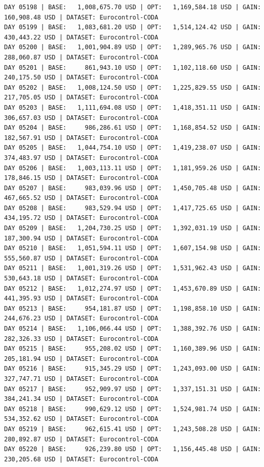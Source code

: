\documentclass[11pt,a4paper]{article}
\begin{document}
\begin{verbatim}
DAY 05198 | BASE:   1,008,675.70 USD | OPT:   1,169,584.18 USD | GAIN: 160,908.48 USD | DATASET: Eurocontrol-CODA
DAY 05199 | BASE:   1,083,681.20 USD | OPT:   1,514,124.42 USD | GAIN: 430,443.22 USD | DATASET: Eurocontrol-CODA
DAY 05200 | BASE:   1,001,904.89 USD | OPT:   1,289,965.76 USD | GAIN: 288,060.87 USD | DATASET: Eurocontrol-CODA
DAY 05201 | BASE:     861,943.10 USD | OPT:   1,102,118.60 USD | GAIN: 240,175.50 USD | DATASET: Eurocontrol-CODA
DAY 05202 | BASE:   1,008,124.50 USD | OPT:   1,225,829.55 USD | GAIN: 217,705.05 USD | DATASET: Eurocontrol-CODA
DAY 05203 | BASE:   1,111,694.08 USD | OPT:   1,418,351.11 USD | GAIN: 306,657.03 USD | DATASET: Eurocontrol-CODA
DAY 05204 | BASE:     986,286.61 USD | OPT:   1,168,854.52 USD | GAIN: 182,567.91 USD | DATASET: Eurocontrol-CODA
DAY 05205 | BASE:   1,044,754.10 USD | OPT:   1,419,238.07 USD | GAIN: 374,483.97 USD | DATASET: Eurocontrol-CODA
DAY 05206 | BASE:   1,003,113.11 USD | OPT:   1,181,959.26 USD | GAIN: 178,846.15 USD | DATASET: Eurocontrol-CODA
DAY 05207 | BASE:     983,039.96 USD | OPT:   1,450,705.48 USD | GAIN: 467,665.52 USD | DATASET: Eurocontrol-CODA
DAY 05208 | BASE:     983,529.94 USD | OPT:   1,417,725.65 USD | GAIN: 434,195.72 USD | DATASET: Eurocontrol-CODA
DAY 05209 | BASE:   1,204,730.25 USD | OPT:   1,392,031.19 USD | GAIN: 187,300.94 USD | DATASET: Eurocontrol-CODA
DAY 05210 | BASE:   1,051,594.11 USD | OPT:   1,607,154.98 USD | GAIN: 555,560.87 USD | DATASET: Eurocontrol-CODA
DAY 05211 | BASE:   1,001,319.26 USD | OPT:   1,531,962.43 USD | GAIN: 530,643.18 USD | DATASET: Eurocontrol-CODA
DAY 05212 | BASE:   1,012,274.97 USD | OPT:   1,453,670.89 USD | GAIN: 441,395.93 USD | DATASET: Eurocontrol-CODA
DAY 05213 | BASE:     954,181.87 USD | OPT:   1,198,858.10 USD | GAIN: 244,676.23 USD | DATASET: Eurocontrol-CODA
DAY 05214 | BASE:   1,106,066.44 USD | OPT:   1,388,392.76 USD | GAIN: 282,326.33 USD | DATASET: Eurocontrol-CODA
DAY 05215 | BASE:     955,208.02 USD | OPT:   1,160,389.96 USD | GAIN: 205,181.94 USD | DATASET: Eurocontrol-CODA
DAY 05216 | BASE:     915,345.29 USD | OPT:   1,243,093.00 USD | GAIN: 327,747.71 USD | DATASET: Eurocontrol-CODA
DAY 05217 | BASE:     952,909.97 USD | OPT:   1,337,151.31 USD | GAIN: 384,241.34 USD | DATASET: Eurocontrol-CODA
DAY 05218 | BASE:     990,629.12 USD | OPT:   1,524,981.74 USD | GAIN: 534,352.62 USD | DATASET: Eurocontrol-CODA
DAY 05219 | BASE:     962,615.41 USD | OPT:   1,243,508.28 USD | GAIN: 280,892.87 USD | DATASET: Eurocontrol-CODA
DAY 05220 | BASE:     926,239.80 USD | OPT:   1,156,445.48 USD | GAIN: 230,205.68 USD | DATASET: Eurocontrol-CODA

\end{verbatim}
\end{document}
